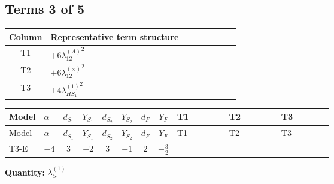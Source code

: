 \documentclass[8pt]{article}
\begin{document}
\begin{landscape}
\subsection*{Terms 3 of 5}
\begin{center}
\begin{tabular}{@{}c >{\raggedright\arraybackslash}p{0.82\linewidth}@{}}
\toprule
Column & Representative term structure \\
\midrule
T1 & \(\displaystyle +6 {\lambda_{12}^{(A)}}^2\) \\
\midrule
T2 & \(\displaystyle +6 {\lambda_{12}^{(\times)}}^2\) \\
\midrule
T3 & \(\displaystyle +4 {\lambda_{HS_1}^{(1)}}^2\) \\
\midrule
\bottomrule
\end{tabular}
\end{center}
\smallskip
\tiny
\begin{longtable}{@{}llcccccc >{\raggedright\arraybackslash}p{0.21\linewidth} >{\raggedright\arraybackslash}p{0.21\linewidth} >{\raggedright\arraybackslash}p{0.21\linewidth}@{}}
\toprule
Model & $\alpha$ & $d_{S_1}$ & $Y_{S_1}$ & $d_{S_2}$ & $Y_{S_2}$ & $d_F$ & $Y_F$ & T1 & T2 & T3 \\
\midrule
\endfirsthead
\toprule
Model & $\alpha$ & $d_{S_1}$ & $Y_{S_1}$ & $d_{S_2}$ & $Y_{S_2}$ & $d_F$ & $Y_F$ & T1 & T2 & T3 \\
\midrule
\endhead
T3-E & $-4$ & $3$ & $-2$ & $3$ & $-1$ & $2$ & $-\frac{3}{2}$ & \scriptsize\adjustbox{max width=\linewidth}{$\begin{gathered} +6 {\lambda_{12}^{(A)}}^2\end{gathered}$} & \scriptsize\adjustbox{max width=\linewidth}{$\begin{gathered} +6 {\lambda_{12}^{(\times)}}^2\end{gathered}$} & \scriptsize\adjustbox{max width=\linewidth}{$\begin{gathered} +4 {\lambda_{HS_1}^{(1)}}^2\end{gathered}$} \\
\midrule
\bottomrule
\end{longtable}
\clearpage
\noindent\textbf{Quantity: }$\lambda_{S_1}^{(1)}$\par\smallskip

\end{landscape}
\end{document}
